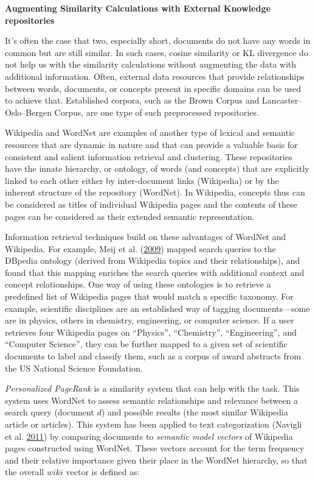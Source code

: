 \documentclass[]{krantz}
\begin{document}
\textbf{Augmenting Similarity Calculations with External Knowledge
repositories}

It's often the case that two, especially short, documents do not have
any words in common but are still similar. In such cases, cosine
similarity or KL divergence do not help us with the similarity
calculations without augmenting the data with additional information.
Often, external data resources that provide relationships between words,
documents, or concepts present in specific domains can be used to
achieve that. Established corpora, such as the Brown Corpus and
Lancaster--Oslo--Bergen Corpus, are one type of such preprocessed
repositories.

Wikipedia and WordNet are examples of another type of lexical and
semantic resources that are dynamic in nature and that can provide a
valuable basis for consistent and salient information retrieval and
clustering. These repositories have the innate hierarchy, or ontology,
of words (and concepts) that are explicitly linked to each other either
by inter-document links (Wikipedia) or by the inherent structure of the
repository (WordNet). In Wikipedia, concepts thus can be considered as
titles of individual Wikipedia pages and the contents of these pages can
be considered as their extended semantic representation.

Information retrieval techniques build on these advantages of WordNet
and Wikipedia. For example, Meij et al.
(\protect\hyperlink{ref-meij-09}{2009}) mapped search queries to the
DBpedia ontology (derived from Wikipedia topics and their
relationships), and found that this mapping enriches the search queries
with additional context and concept relationships. One way of using
these ontologies is to retrieve a predefined list of Wikipedia pages
that would match a specific taxonomy. For example, scientific
disciplines are an established way of tagging documents---some are in
physics, others in chemistry, engineering, or computer science. If a
user retrieves four Wikipedia pages on ``Physics'', ``Chemistry'',
``Engineering'', and ``Computer Science'', they can be further mapped to
a given set of scientific documents to label and classify them, such as
a corpus of award abstracts from the US National Science Foundation.

\emph{Personalized PageRank} is a similarity system that can help with
the task. This system uses WordNet to assess semantic relationships and
relevance between a search query (document \(d\)) and possible results
(the most similar Wikipedia article or articles). This system has been
applied to text categorization (Navigli et al.
\protect\hyperlink{ref-navigli-11}{2011}) by comparing documents to
\emph{semantic model vectors} of Wikipedia pages constructed using
WordNet. These vectors account for the term frequency and their relative
importance given their place in the WordNet hierarchy, so that the
overall \(wiki\) vector is defined as:
\end{document}
